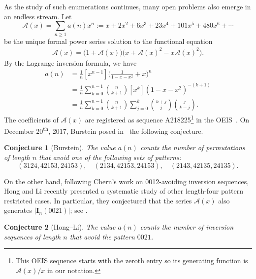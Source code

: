 \documentclass[reqno]{amsart}
\numberwithin{equation}{section}
\theoremstyle{plain}
\newtheorem{conjecture}{Conjecture}[section]
\theoremstyle{definition}
\theoremstyle{named}
\newcommand{\bI}{\mathbf{I}}
\newcommand{\cA}{\mathcal{A}}
\begin{document}
As the study of such enumerations continues, many open problems also emerge in an endless stream. Let
$$\cA(x)=\sum_{n\ge 1}a(n)x^n:=x+2x^2+6x^3+23x^4+101x^5+480x^6+\cdots$$
be the unique formal power series solution to the  functional equation
\begin{align}\label{eq:A-eq}
	\cA(x)=\big(1+\cA(x)\big)\big(x+\cA(x)^2-x\cA(x)^2\big).
\end{align}
By the Lagrange inversion formula, we have 
\begin{align*}
a(n)&=\frac{1}{n}[x^{n-1}]\biggl(\frac{1}{1-x-x^2}+x\biggr)^n\\
&=\frac{1}{n}\sum_{k=0}^{n-1}\binom{n}{k+1}[x^k](1-x-x^2)^{-(k+1)}\\
&=\frac{1}{n}\sum_{k=0}^{n-1}\binom{n}{k+1}\sum_{j=0}^k\binom{k+j}{j}\binom{j}{k-j}.
\end{align*}
The coefficients of $\cA(x)$ are registered as sequence A218225\footnote{This OEIS sequence starts with the zeroth entry so its generating function is $\cA(x)/x$ in our notation.} in the OEIS~\cite{OEIS}. On December 20\textsuperscript{th}, 2017, Burstein posed in~\cite[A218225]{OEIS} the following conjecture.

\begin{conjecture}[Burstein]\label{conj:Bur}
	The value $a(n)$ counts the number of permutations of length $n$ that avoid one of the following sets of patterns:
	$$(3124, 42153, 24153),\quad (2134, 42153, 24153),\quad (2143, 42135, 24135).$$
\end{conjecture}

On the other hand, following Chern's work \cite{Che2022} on 0012-avoiding inversion sequences, Hong and Li \cite{HL2021} recently presented a systematic study of other length-four pattern restricted cases. In particular, they conjectured that the series $\cA(x)$ also generates $|\bI_n(0021)|$; see \cite[Conjecture 4.3]{HL2021}.

\begin{conjecture}[Hong--Li]\label{conj:HL}
	The value $a(n)$ counts the number of inversion sequences of length $n$ that avoid the pattern $0021$.
\end{conjecture}
\end{document}
